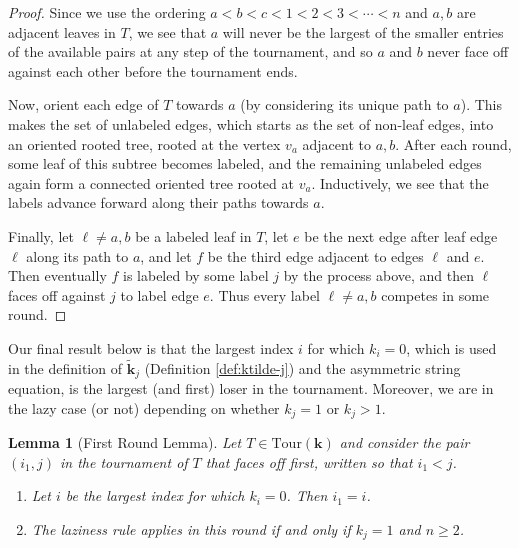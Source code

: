 \documentclass[11pt]{amsart}
\newcommand{\Tour}{\mathrm{Tour}}
\newtheorem{lemma}[thm]{Lemma}
\numberwithin{thm}{section}
\numberwithin{equation}{section}
\numberwithin{figure}{section}
\theoremstyle{definition}
\begin{document}
\begin{proof}
  Since we use the ordering $a<b<c<1<2<3<\cdots<n$ and $a,b$ are adjacent leaves in $T$, we see that $a$ will never be the largest of the smaller entries of the available pairs at any step of the tournament, and so $a$ and $b$ never face off against each other before the tournament ends.
   
  Now, orient each edge of $T$ towards $a$ (by considering its unique path to $a$).  This makes the set of unlabeled edges, which starts as the set of non-leaf edges, into an oriented rooted tree, rooted at the vertex $v_a$ adjacent to $a,b$.  After each round, some leaf of this subtree becomes labeled, and the remaining unlabeled edges again form a connected oriented tree rooted at $v_a$.  Inductively, we see that the labels advance forward along their paths towards $a$.
  
  Finally, let $\ell\neq a,b$ be a labeled leaf in $T$, let $e$ be the next edge after leaf edge $\ell$ along its path to $a$, and let $f$ be the third edge adjacent to edges $\ell$ and $e$.  Then eventually $f$ is labeled by some label $j$ by the process above, and then $\ell$ faces off against $j$ to label edge $e$.  Thus every label $\ell\neq a,b$ competes in some round.
\end{proof}


Our final result below is that the largest index $i$ for which $k_i=0$, which is used in the definition of $\widetilde{\mathbf{k}}_j$ (Definition \ref{def:ktilde-j}) and the asymmetric string equation, is the largest (and first) loser in the tournament.   Moreover, we are in the lazy case (or not) depending on whether $k_j=1$ or $k_j>1$.

\begin{lemma}[First Round Lemma]\label{lem:biggest-loser}
   Let $T\in \Tour(\mathbf{k})$ and consider the pair $(i_1,j)$ in the tournament of $T$ that faces off first, written so that $i_1<j$.  
\begin{enumerate}
    \item Let $i$ be the largest index for which $k_i=0$.  Then $i_1=i$.  
   \item The laziness rule applies in this round if and only if $k_j=1$ and $n\ge 2$.
\end{enumerate} 
\end{lemma}
\end{document}
